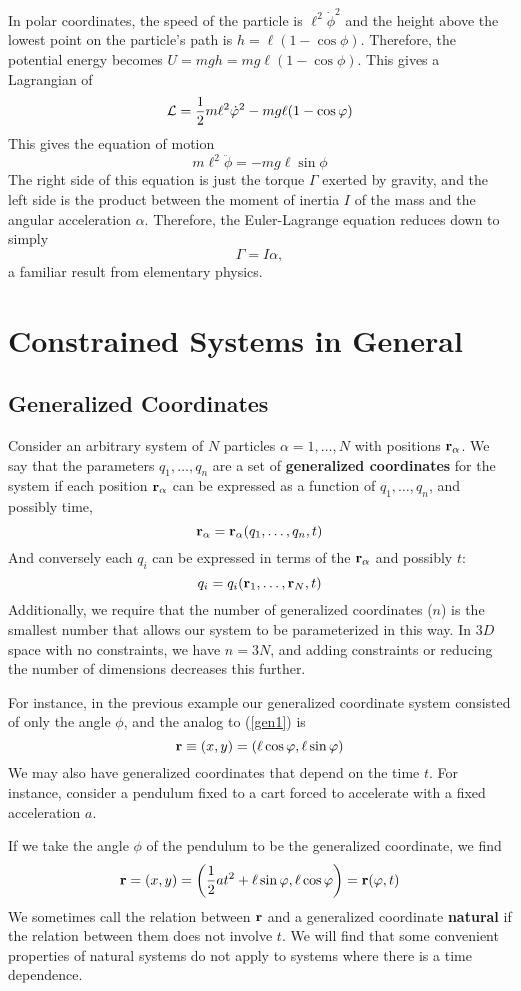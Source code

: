 In polar coordinates, the speed of the particle is $\ell^2\dot\phi^2$ and the height above the lowest point on the particle's path is $h = \ell(1-\cos\phi)$. Therefore, the potential energy becomes $U = mgh = mg\ell(1-\cos\phi)$. This gives a Lagrangian of
\[ \mathcal{L} = \frac{1}{2}m\ell^2\dot{\varphi}^2 - mg\ell(1-\cos\varphi) \]
This gives the equation of motion
\[ m\ell^2\ddot\phi = -mg\ell\sin\phi\]
The right side of this equation is just the torque $\Gamma$ exerted by gravity, and the left side is the product between the moment of inertia $I$ of the mass and the angular acceleration $\alpha$. Therefore, the Euler-Lagrange equation reduces down to simply
\[ \Gamma = I\alpha, \]
a familiar result from elementary physics.
\section{Constrained Systems in General}
\subsection*{Generalized Coordinates}
Consider an arbitrary system of $N$ particles $\alpha = 1, \dots, N$ with positions $\mathbf{r}_\alpha$. We say that the parameters $q_1, \dots, q_n$ are a set of \textbf{generalized coordinates} for the system if each position $\mathbf{r}_\alpha$ can be expressed as a function of $q_1, \dots, q_n$, and possibly time,
\begin{equation} \label{gen1}
    \mathbf{r}_\alpha = \mathbf{r}_\alpha(q_1, \dots, q_n, t) 
\end{equation}
And conversely each $q_i$ can be expressed in terms of the $\mathbf{r}_\alpha$ and possibly $t$:
\[ q_i = q_i(\mathbf{r}_1, \dots, \mathbf{r}_N, t) \]
Additionally, we require that the number of generalized coordinates ($n$) is the smallest number that allows our system to be parameterized in this way. In $3D$ space with no constraints, we have $n=3N$, and adding constraints or reducing the number of dimensions decreases this further. 

For instance, in the previous example our generalized coordinate system consisted of only the angle $\phi$, and the analog to (\ref{gen1}) is
\[ \mathbf{r} \equiv (x,y) = (\ell\cos\varphi, \ell\sin\varphi)\]
We may also have generalized coordinates that depend on the time $t$. For instance, consider a pendulum fixed to a cart forced to accelerate with a fixed acceleration $a$. 

If we take the angle $\phi$ of the pendulum to be the generalized coordinate, we find
\[ \mbf r = (x, y) = \pqty{\frac{1}{2}at^2 + \ell\sin\phi, \ell\cos\phi} = \mbf r(\phi, t) \]
We sometimes call the relation between $\mathbf{r}$ and a generalized coordinate \textbf{natural} if the relation between them does not involve $t$. We will find that some convenient properties of natural systems do not apply to systems where there is a time dependence. 
